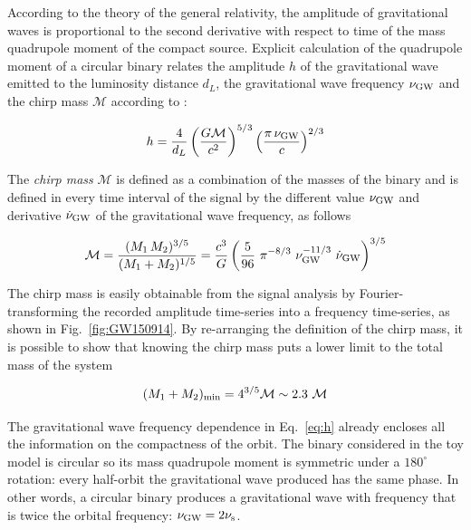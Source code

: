 \documentclass[a4paper,titlepage]{book}     	%
\begin{document}
According to the theory of the general relativity, the amplitude of  gravitational waves is proportional to the second derivative with respect to time of the mass quadrupole moment of the compact source.  Explicit calculation of the quadrupole moment of a circular binary relates the amplitude $h$  of the gravitational wave emitted to the luminosity distance $d_L$, the gravitational wave frequency $\nu_{\rm GW}$ and the chirp mass $\mathcal{M}$ according to \cite{MaggioreGW,GWreview}:

\begin{equation}\label{eq:h}
h = \frac{4}{d_L} \left(\frac{G \mathcal{M}}{c^2}\right)^{5/3} \left(\frac{\pi \,{}\nu_{\rm GW}}{c}\right)^{2/3} 
\end{equation}

The \emph{chirp mass} $\mathcal{M}$ is defined as a combination of the masses of the binary and is defined in every time interval of the signal by the different value $\nu_{\rm GW}$ and derivative $\dot{\nu}_{\rm GW}$ of the gravitational wave frequency, as follows

\begin{equation}\label{eq:Mchirp}
\mathcal{M} = 
\frac{(M_1\,{}M_2)^{3/5}}{(M_1+M_2)^{1/5}} =
\frac{c^3}{G} \left(\frac{5}{96}~ \pi^{-8/3}~\nu_{\rm GW}^{-11/3}~ \dot{\nu}_{\rm GW}\right)^{3/5}
\end{equation}

The chirp mass is easily obtainable from the signal analysis by Fourier-transforming the recorded amplitude time-series into a frequency time-series, as shown in Fig.\ \ref{fig:GW150914}. By re-arranging the definition of the chirp mass, it is possible to show that knowing the chirp mass puts a lower limit to the total mass of the system

\begin{equation}
(M_1 + M_2)_{\rm min} = 4^{3/5} \mathcal{M} \sim 2.3~\mathcal{M}
\end{equation}


The gravitational wave frequency dependence in Eq.\ \ref{eq:h} already encloses all the information on the compactness of the orbit. The binary considered in the toy model is circular so its mass quadrupole moment is symmetric under a $180^\circ$ rotation: every half-orbit the gravitational wave produced has the same phase. In other words, a circular binary produces a gravitational wave  with frequency that is twice the orbital frequency:  $\nu_{\rm GW} = 2 \nu_{\rm s}$. \\
\end{document}
